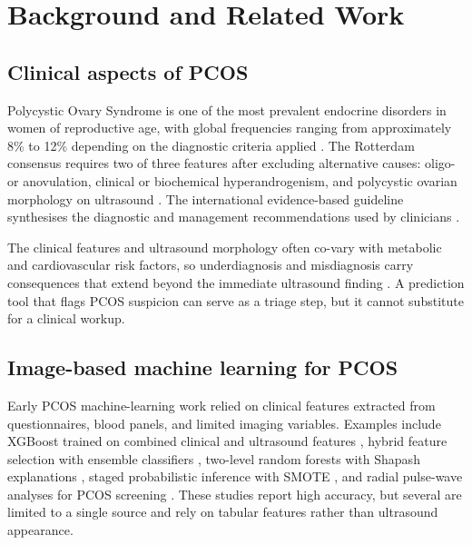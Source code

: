 \documentclass[../preamble.tex]{subfiles}
\begin{document}
\chapter{Background and Related Work}
\label{ch:background}

\section{Clinical aspects of PCOS}
\label{sec:bg-clinical}

Polycystic Ovary Syndrome is one of the most prevalent endocrine disorders
in women of reproductive age, with global frequencies ranging from
approximately 8\% to 12\% depending on the diagnostic criteria applied
\cite{ghaderzadeh2025,patil2025,mahesswari2024}. The Rotterdam consensus
requires two of three features after excluding alternative causes:
oligo- or anovulation, clinical or biochemical hyperandrogenism, and
polycystic ovarian morphology on ultrasound \cite{rotterdam2003}. The
international evidence-based guideline synthesises the diagnostic and
management recommendations used by clinicians \cite{teede2018}.

The clinical features and ultrasound morphology often co-vary with metabolic
and cardiovascular risk factors, so underdiagnosis and misdiagnosis carry
consequences that extend beyond the immediate ultrasound finding
\cite{ghaderzadeh2025,nsugbe2023}. A prediction tool that flags PCOS
suspicion can serve as a triage step, but it cannot substitute for a clinical
workup.

\section{Image-based machine learning for PCOS}
\label{sec:bg-imaging-ml}

Early PCOS machine-learning work relied on clinical features extracted from
questionnaires, blood panels, and limited imaging variables. Examples include
XGBoost trained on combined clinical and ultrasound features
\cite{agirsoy2025}, hybrid feature selection with ensemble classifiers
\cite{patil2025}, two-level random forests with Shapash explanations
\cite{mahesswari2024}, staged probabilistic inference with SMOTE
\cite{nsugbe2023}, and radial pulse-wave analyses for PCOS screening
\cite{lim2023}. These studies report high accuracy, but several are limited to
a single source and rely on tabular features rather than ultrasound
appearance.
\end{document}
